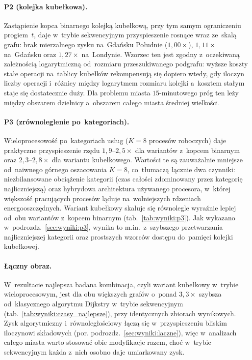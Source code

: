 \paragraph{P2 (kolejka kubełkowa).}
Zastąpienie kopca binarnego kolejką kubełkową, przy tym samym ograniczeniu
progiem~$t$, daje w~trybie sekwencyjnym przyspieszenie rosnące wraz
ze~skalą grafu: brak mierzalnego zysku na~Gdańsku Południe ($1{,}00\times$),
$1{,}11\times$ na~Gdańsku oraz $1{,}27\times$ na~Londynie. Wzorzec ten jest
zgodny z~oczekiwaną zależnością logarytmiczną od~rozmiaru przeszukiwanego
podgrafu: wyższe koszty stałe operacji na~tablicy kubełków rekompensują się
dopiero wtedy, gdy iloczyn liczby operacji i~różnicy między logarytmem
rozmiaru kolejki a~kosztem stałym staje się dostatecznie duży. Dla problemu
miasta $15$-minutowego próg ten leży między obszarem dzielnicy a~obszarem całego
miasta średniej wielkości.

\paragraph{P3 (zrównoleglenie po~kategoriach).}
Wieloprocesowość po~kategoriach usług ($K=8$ procesów roboczych) daje
praktyczne przyspieszenie rzędu $1{,}9$--$2{,}5\times$ dla wariantów z~kopcem
binarnym oraz $2{,}3$--$2{,}8\times$ dla wariantu kubełkowego. Wartości te są
zauważalnie mniejsze od~naiwnego górnego oszacowania $K=8$, co~tłumaczą
łącznie dwa czynniki: niezbilansowane obciążenie kategorii (czas całości
zdominowany przez kategorię najliczniejszą) oraz hybrydowa architektura
używanego procesora, w~której większość pracujących procesów ląduje na~wolniejszych
rdzeniach energooszczędnych. Wariant kubełkowy skaluje się równolegle wyraźnie lepiej od~obu wariantów
z~kopcem binarnym (tab.~\ref{tab:wyniki:p3}). Jak wykazano w~podrozdz.~\ref{sec:wyniki:p3},
wynika to m.in.\ z~szybszego przetwarzania najliczniejszej kategorii
oraz prostszych wzorców dostępu do~pamięci kolejki kubełkowej.

\clearpage

\paragraph{Łączny obraz.}
W~rezultacie najlepsza badana kombinacja, czyli wariant kubełkowy w~trybie
wieloprocesowym, jest dla obu większych grafów o~ponad $3{,}3\times$
szybsza od~klasycznego algorytmu Dijkstry w~trybie sekwencyjnym
(tab.~\ref{tab:wyniki:czasy_najlepsze}), przy identycznych zbiorach
wynikowych. Zysk algorytmiczny i~równoległościowy łączą się w~przyspieszeniu
bliskim iloczynowi składowych (por. podrozdz.~\ref{sec:wyniki:laczne}), więc
w~analizach całego miasta warto stosować obie modyfikacje razem, choć
w~trybie sekwencyjnym każda z~nich osobno daje umiarkowany zysk.

